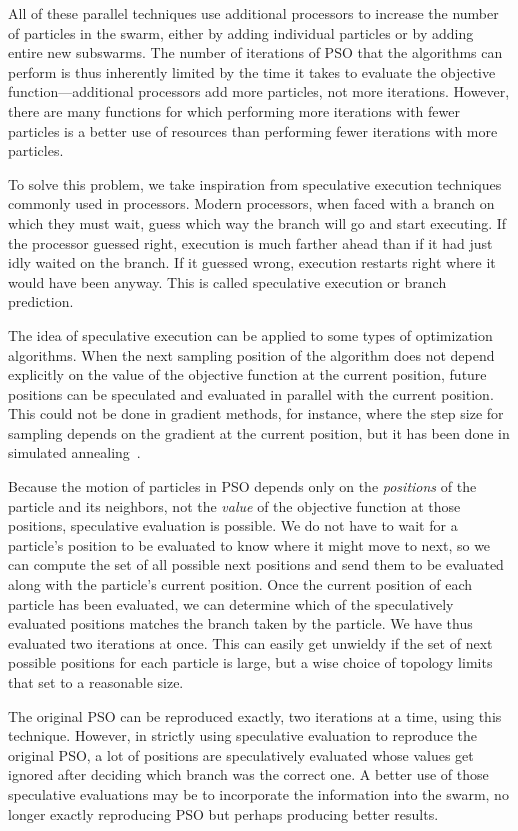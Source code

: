 \documentclass[conference,letterpaper]{IEEEtran}
\begin{document}
All of these parallel techniques use additional processors to increase the
number of particles in the swarm, either by adding individual particles or by
adding entire new subswarms.  The number of iterations of PSO that the
algorithms can perform is thus inherently limited by the time it takes to
evaluate the objective function---additional processors add more particles, not
more iterations.  However, there are many functions for which performing more
iterations with fewer particles is a better use of resources than performing
fewer iterations with more particles.  

To solve this problem, we take inspiration from speculative execution
techniques commonly used in processors.  Modern processors, when faced with a
branch on which they must wait, guess which way the branch will go and start
executing.  If the processor guessed right, execution is much farther ahead
than if it had just idly waited on the branch.  If it guessed wrong, execution
restarts right where it would have been anyway.  This is called speculative
execution or branch prediction.

The idea of speculative execution can be applied to some types of optimization
algorithms.  When the next sampling position of the algorithm does not depend
explicitly on the value of the objective function at the current position,
future positions can be speculated and evaluated in parallel with the current
position.  This could not be done in gradient methods, for instance, where the
step size for sampling depends on the gradient at the current position, but it
has been done in simulated annealing~\cite{witte-tpds91}.

Because the motion of particles in PSO depends only on the \emph{positions} of
the particle and its neighbors, not the \emph{value} of the objective function
at those positions, speculative evaluation is possible.  We do not have to wait
for a particle's position to be evaluated to know where it might move to next,
so we can compute the set of all possible next positions and send them to be
evaluated along with the particle's current position.  Once the current
position of each particle has been evaluated, we can determine which of the
speculatively evaluated positions matches the branch taken by the particle.  We
have thus evaluated two iterations at once.  This can easily get unwieldy if
the set of next possible positions for each particle is large, but a wise
choice of topology limits that set to a reasonable size.

The original PSO can be reproduced exactly, two iterations at a time, using
this technique.  However, in strictly using speculative evaluation to reproduce
the original PSO, a lot of positions are speculatively evaluated whose values
get ignored after deciding which branch was the correct one.  A better use of
those speculative evaluations may be to incorporate the information into the
swarm, no longer exactly reproducing PSO but perhaps producing better results.
\end{document}
